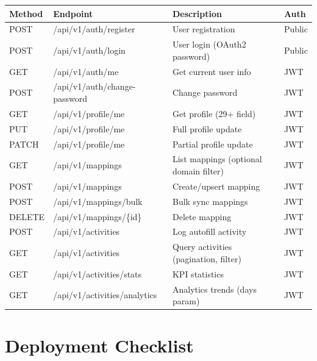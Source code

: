 \documentclass[12pt,a4paper]{article}
\begin{document}
\begin{center}
\begin{tabular}{|p{2cm}|p{3.5cm}|p{4cm}|p{1.5cm}|}
\hline
\textbf{Method} & \textbf{Endpoint} & \textbf{Description} & \textbf{Auth} \\
\hline
POST & /api/v1/auth/register & User registration & Public \\
\hline
POST & /api/v1/auth/login & User login (OAuth2 password) & Public \\
\hline
GET & /api/v1/auth/me & Get current user info & JWT \\
\hline
POST & /api/v1/auth/change-password & Change password & JWT \\
\hline
GET & /api/v1/profile/me & Get profile (29+ field) & JWT \\
\hline
PUT & /api/v1/profile/me & Full profile update & JWT \\
\hline
PATCH & /api/v1/profile/me & Partial profile update & JWT \\
\hline
GET & /api/v1/mappings & List mappings (optional domain filter) & JWT \\
\hline
POST & /api/v1/mappings & Create/upsert mapping & JWT \\
\hline
POST & /api/v1/mappings/bulk & Bulk sync mappings & JWT \\
\hline
DELETE & /api/v1/mappings/\{id\} & Delete mapping & JWT \\
\hline
POST & /api/v1/activities & Log autofill activity & JWT \\
\hline
GET & /api/v1/activities & Query activities (pagination, filter) & JWT \\
\hline
GET & /api/v1/activities/stats & KPI statistics & JWT \\
\hline
GET & /api/v1/activities/analytics & Analytics trends (days param) & JWT \\
\hline
\end{tabular}
\end{center}

\section{Deployment Checklist}
\end{document}

